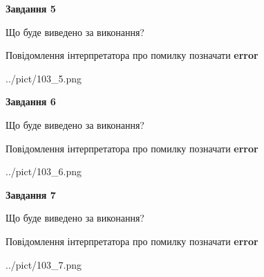 \documentclass[10pt, ukrainian]{article}
\begin{document}
{\begin {large}
{\begin {center}\textbf{Завдання 5}\end {center}}\par
Що буде виведено за виконання? \par
Повідомлення інтерпретатора про помилку позначати \textbf{error}

\begin{center}
	{../pict/103_5.png}
\end{center}
\newpage

{\begin {center}\textbf{Завдання 6}\end {center}}\par
Що буде виведено за виконання? \par
Повідомлення інтерпретатора про помилку позначати \textbf{error}

\begin{center}
	{../pict/103_6.png}
\end{center}
\newpage

{\begin {center}\textbf{Завдання 7}\end {center}}\par
Що буде виведено за виконання? \par
Повідомлення інтерпретатора про помилку позначати \textbf{error}

\begin{center}
	{../pict/103_7.png}
\end{center}
\newpage

\end {large}}
\end{document}
